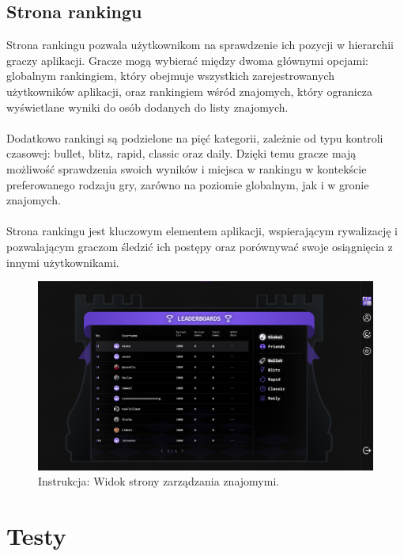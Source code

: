 \documentclass[12pt,a4paper]{article}
\begin{document}
\newpage

\subsection{Strona rankingu}
Strona rankingu pozwala użytkownikom na sprawdzenie ich pozycji w hierarchii graczy aplikacji. Gracze mogą wybierać między dwoma głównymi opcjami: globalnym rankingiem, który obejmuje wszystkich zarejestrowanych użytkowników aplikacji, oraz rankingiem wśród znajomych, który ogranicza wyświetlane wyniki do osób dodanych do listy znajomych.
\\\\
Dodatkowo rankingi są podzielone na pięć kategorii, zależnie od typu kontroli czasowej: bullet, blitz, rapid, classic oraz daily. Dzięki temu gracze mają możliwość sprawdzenia swoich wyników i miejsca w rankingu w kontekście preferowanego rodzaju gry, zarówno na poziomie globalnym, jak i w gronie znajomych.
\\\\
Strona rankingu jest kluczowym elementem aplikacji, wspierającym rywalizację i pozwalającym graczom śledzić ich postępy oraz porównywać swoje osiągnięcia z innymi użytkownikami.

\vspace{0.5cm}
\begin{figure}[h!]
    \centering
    \includegraphics[width=1\textwidth]{images/ins_rank.png}
    \caption{Instrukcja: Widok strony zarządzania znajomymi.}
\end{figure}

\newpage

\section{Testy}
\end{document}
